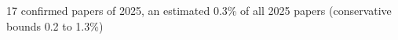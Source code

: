 17 confirmed papers of 2025, an estimated 0.3\% of all 2025 papers (conservative bounds 0.2 to 1.3\%)